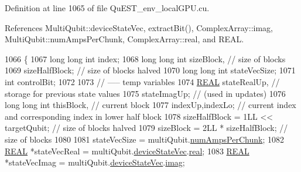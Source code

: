 Definition at line 1065 of file Qu\+E\+S\+T\+\_\+env\+\_\+local\+G\+P\+U.\+cu.



References Multi\+Qubit\+::device\+State\+Vec, extract\+Bit(), Complex\+Array\+::imag, Multi\+Qubit\+::num\+Amps\+Per\+Chunk, Complex\+Array\+::real, and R\+E\+AL.


\begin{DoxyCode}
1066 \{
1067     \textcolor{keywordtype}{long} \textcolor{keywordtype}{long} \textcolor{keywordtype}{int} index;
1068     \textcolor{keywordtype}{long} \textcolor{keywordtype}{long} \textcolor{keywordtype}{int} sizeBlock,                                           \textcolor{comment}{// size of blocks}
1069          sizeHalfBlock;                                       \textcolor{comment}{// size of blocks halved}
1070     \textcolor{keywordtype}{long} \textcolor{keywordtype}{long} \textcolor{keywordtype}{int} stateVecSize;
1071     \textcolor{keywordtype}{int} controlBit;
1072 
1073     \textcolor{comment}{// ----- temp variables}
1074     \mbox{\hyperlink{QuEST__precision_8h_a4b654506f18b8bfd61ad2a29a7e38c25}{REAL}}   stateRealUp,                             \textcolor{comment}{// storage for previous state values}
1075            stateImagUp;                             \textcolor{comment}{// (used in updates)}
1076     \textcolor{keywordtype}{long} \textcolor{keywordtype}{long} \textcolor{keywordtype}{int} thisBlock,                                           \textcolor{comment}{// current block}
1077          indexUp,indexLo;                                     \textcolor{comment}{// current index and corresponding index in
       lower half block}
1078     sizeHalfBlock = 1LL << targetQubit;                               \textcolor{comment}{// size of blocks halved}
1079     sizeBlock     = 2LL * sizeHalfBlock;                           \textcolor{comment}{// size of blocks}
1080 
1081     stateVecSize = multiQubit.\mbox{\hyperlink{structMultiQubit_a1cad83601a78635dd278259c7ed54f18}{numAmpsPerChunk}};
1082     \mbox{\hyperlink{QuEST__precision_8h_a4b654506f18b8bfd61ad2a29a7e38c25}{REAL}} *stateVecReal = multiQubit.\mbox{\hyperlink{structMultiQubit_a59ac613486a41b8c9a4b6e79cc8d2cc3}{deviceStateVec}}.\mbox{\hyperlink{structComplexArray_a4195cac6c784ea1b6271f1c7dba1548a}{real}};
1083     \mbox{\hyperlink{QuEST__precision_8h_a4b654506f18b8bfd61ad2a29a7e38c25}{REAL}} *stateVecImag = multiQubit.\mbox{\hyperlink{structMultiQubit_a59ac613486a41b8c9a4b6e79cc8d2cc3}{deviceStateVec}}.\mbox{\hyperlink{structComplexArray_a79dde47c7ae530c79cebfdf57b225968}{imag}};

\end{DoxyCode}
